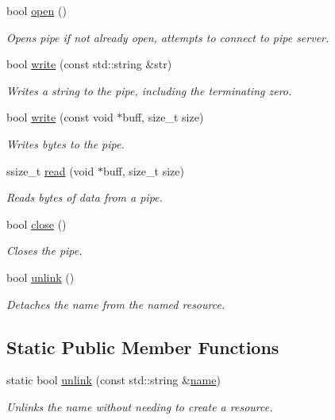 \begin{DoxyCompactItemize}
bool \hyperlink{classcpen333_1_1process_1_1windows_1_1pipe_a25b30161d315cfd4ad1b9fdaf55d56b0}{open} ()
\begin{DoxyCompactList}\small\item\em Opens pipe if not already open, attempts to connect to pipe server. \end{DoxyCompactList}\item 
bool \hyperlink{classcpen333_1_1process_1_1windows_1_1pipe_a633e73bc0c412b17a9c536251a746500}{write} (const std\+::string \&str)
\begin{DoxyCompactList}\small\item\em Writes a string to the pipe, including the terminating zero. \end{DoxyCompactList}\item 
bool \hyperlink{classcpen333_1_1process_1_1windows_1_1pipe_a072e8bded1b6f0a45683875ed3be1aa2}{write} (const void $\ast$buff, size\+\_\+t size)
\begin{DoxyCompactList}\small\item\em Writes bytes to the pipe. \end{DoxyCompactList}\item 
ssize\+\_\+t \hyperlink{classcpen333_1_1process_1_1windows_1_1pipe_a35e7d782aae4879ae3625f61b2d78783}{read} (void $\ast$buff, size\+\_\+t size)
\begin{DoxyCompactList}\small\item\em Reads bytes of data from a pipe. \end{DoxyCompactList}\item 
bool \hyperlink{classcpen333_1_1process_1_1windows_1_1pipe_a6d01b3a84c6184ba02e9825003386d20}{close} ()
\begin{DoxyCompactList}\small\item\em Closes the pipe. \end{DoxyCompactList}\item 
bool \hyperlink{classcpen333_1_1process_1_1windows_1_1pipe_abe0bc707040aa7e82ed41c26cc4c93c1}{unlink} ()
\begin{DoxyCompactList}\small\item\em Detaches the name from the named resource. \end{DoxyCompactList}\end{DoxyCompactItemize}
\subsection*{Static Public Member Functions}
\begin{DoxyCompactItemize}
\item 
static bool \hyperlink{classcpen333_1_1process_1_1windows_1_1pipe_a82f71e3bb08dab1a32421062173d09da}{unlink} (const std\+::string \&\hyperlink{classcpen333_1_1process_1_1impl_1_1named__resource__base_a53986a0a1dd26a3602b842c45613b79d}{name})
\begin{DoxyCompactList}\small\item\em Unlinks the name without needing to create a resource. \end{DoxyCompactList}\end{DoxyCompactItemize}
